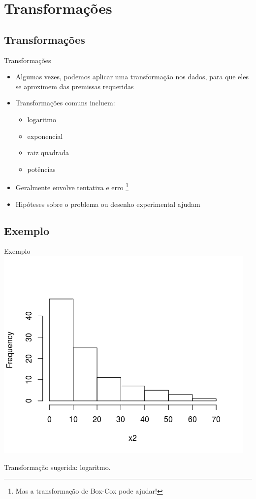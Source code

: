 \documentclass{beamer}
\begin{document}
\section{Transformações}

\subsection{Transformações}

\begin{frame}{Transformações}
  \begin{itemize}
  \item Algumas vezes, podemos aplicar uma transformação nos dados, para que eles se aproximem das premissas requeridas
  \item Transformações comuns incluem:
    \begin{itemize}
    \item logaritmo
    \item exponencial
    \item raiz quadrada
    \item potências
    \end{itemize}
  \item Geralmente envolve tentativa e erro \footnote{Mas a transformação de Box-Cox pode ajudar!}
  \item Hipóteses sobre o problema ou desenho experimental ajudam
  \end{itemize}
\end{frame}

\subsection{Exemplo}

\begin{frame}{Exemplo}
  \centering
  \includegraphics[width=.8\textwidth]{Cap37-38/lognormal1-h}

Transformação sugerida: logaritmo.
\end{frame}
\end{document}
